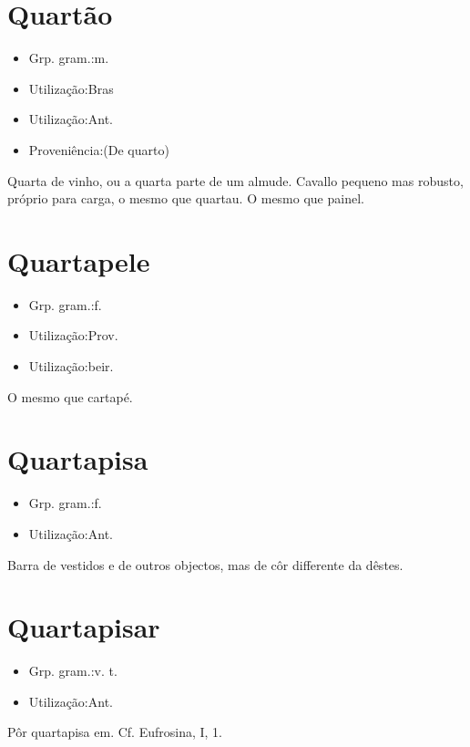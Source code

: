 \section{Quartão}
\begin{itemize}
\item {Grp. gram.:m.}
\end{itemize}
\begin{itemize}
\item {Utilização:Bras}
\end{itemize}
\begin{itemize}
\item {Utilização:Ant.}
\end{itemize}
\begin{itemize}
\item {Proveniência:(De \textunderscore quarto\textunderscore )}
\end{itemize}
Quarta de vinho, ou a quarta parte de um almude.
Cavallo pequeno mas robusto, próprio para carga, o mesmo que \textunderscore quartau\textunderscore .
O mesmo que \textunderscore painel\textunderscore .
\section{Quartapele}
\begin{itemize}
\item {Grp. gram.:f.}
\end{itemize}
\begin{itemize}
\item {Utilização:Prov.}
\end{itemize}
\begin{itemize}
\item {Utilização:beir.}
\end{itemize}
O mesmo que \textunderscore cartapé\textunderscore .
\section{Quartapisa}
\begin{itemize}
\item {Grp. gram.:f.}
\end{itemize}
\begin{itemize}
\item {Utilização:Ant.}
\end{itemize}
Barra de vestidos e de outros objectos, mas de côr differente da dêstes.
\section{Quartapisar}
\begin{itemize}
\item {Grp. gram.:v. t.}
\end{itemize}
\begin{itemize}
\item {Utilização:Ant.}
\end{itemize}
Pôr quartapisa em. Cf. \textunderscore Eufrosina\textunderscore , I, 1.
